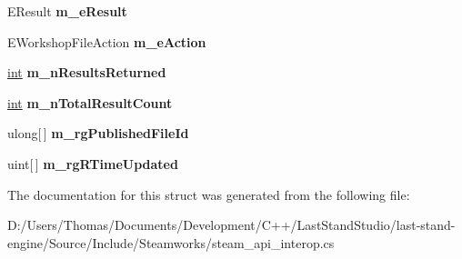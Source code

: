 \begin{DoxyCompactItemize}
\item 
\hypertarget{structValve_1_1Steamworks_1_1RemoteStorageEnumeratePublishedFilesByUserActionResult__t_ad6cc21b16506230965d763697d60de35}{}E\+Result {\bfseries m\+\_\+e\+Result}\label{structValve_1_1Steamworks_1_1RemoteStorageEnumeratePublishedFilesByUserActionResult__t_ad6cc21b16506230965d763697d60de35}

\item 
\hypertarget{structValve_1_1Steamworks_1_1RemoteStorageEnumeratePublishedFilesByUserActionResult__t_a0b30788b488e07c938671bf933693040}{}E\+Workshop\+File\+Action {\bfseries m\+\_\+e\+Action}\label{structValve_1_1Steamworks_1_1RemoteStorageEnumeratePublishedFilesByUserActionResult__t_a0b30788b488e07c938671bf933693040}

\item 
\hypertarget{structValve_1_1Steamworks_1_1RemoteStorageEnumeratePublishedFilesByUserActionResult__t_afcb2f43f473f1d10b80d882e5f416e32}{}\hyperlink{SDL__thread_8h_a6a64f9be4433e4de6e2f2f548cf3c08e}{int} {\bfseries m\+\_\+n\+Results\+Returned}\label{structValve_1_1Steamworks_1_1RemoteStorageEnumeratePublishedFilesByUserActionResult__t_afcb2f43f473f1d10b80d882e5f416e32}

\item 
\hypertarget{structValve_1_1Steamworks_1_1RemoteStorageEnumeratePublishedFilesByUserActionResult__t_a227b4d65fd7901c0ea32a90c16f0ab6a}{}\hyperlink{SDL__thread_8h_a6a64f9be4433e4de6e2f2f548cf3c08e}{int} {\bfseries m\+\_\+n\+Total\+Result\+Count}\label{structValve_1_1Steamworks_1_1RemoteStorageEnumeratePublishedFilesByUserActionResult__t_a227b4d65fd7901c0ea32a90c16f0ab6a}

\item 
\hypertarget{structValve_1_1Steamworks_1_1RemoteStorageEnumeratePublishedFilesByUserActionResult__t_a132adbacce18ca2069b7bace72cc1109}{}ulong\mbox{[}$\,$\mbox{]} {\bfseries m\+\_\+rg\+Published\+File\+Id}\label{structValve_1_1Steamworks_1_1RemoteStorageEnumeratePublishedFilesByUserActionResult__t_a132adbacce18ca2069b7bace72cc1109}

\item 
\hypertarget{structValve_1_1Steamworks_1_1RemoteStorageEnumeratePublishedFilesByUserActionResult__t_a0123af50ca8bde585adff57092bf80b4}{}uint\mbox{[}$\,$\mbox{]} {\bfseries m\+\_\+rg\+R\+Time\+Updated}\label{structValve_1_1Steamworks_1_1RemoteStorageEnumeratePublishedFilesByUserActionResult__t_a0123af50ca8bde585adff57092bf80b4}

\end{DoxyCompactItemize}


The documentation for this struct was generated from the following file\+:\begin{DoxyCompactItemize}
\item 
D\+:/\+Users/\+Thomas/\+Documents/\+Development/\+C++/\+Last\+Stand\+Studio/last-\/stand-\/engine/\+Source/\+Include/\+Steamworks/steam\+\_\+api\+\_\+interop.\+cs\end{DoxyCompactItemize}
